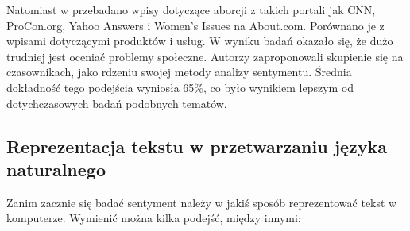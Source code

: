 Natomiast w \cite{SentimentAnalysisOfSocialIssues} przebadano wpisy dotyczące
aborcji z takich portali jak CNN, ProCon.org, Yahoo Answers i Women's Issues na
About.com. Porównano je z wpisami dotyczącymi produktów i usług. W wyniku badań
okazało się, że dużo trudniej jest oceniać problemy społeczne. Autorzy
zaproponowali skupienie się na czasownikach, jako rdzeniu swojej metody analizy
sentymentu. Średnia dokładność tego podejścia wyniosła 65\%, co było wynikiem
lepszym od dotychczasowych badań podobnych tematów.  

\subsection{Reprezentacja tekstu w przetwarzaniu języka naturalnego}
Zanim zacznie się badać sentyment należy w jakiś sposób reprezentować tekst w
komputerze. Wymienić można kilka podejść, między innymi:
